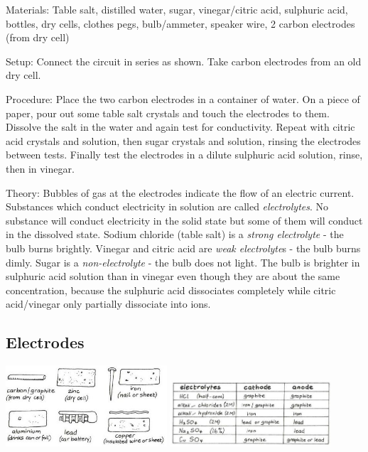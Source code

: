 \begin{multicols}{2}
\begin{description*}
\item[Materials:]{Table salt, distilled water, sugar, vinegar/citric acid, sulphuric acid, bottles, dry cells, clothes pegs, bulb/ammeter, speaker wire, 2 carbon electrodes (from dry cell)}
\item[Setup:]{Connect the circuit in series as shown. Take carbon electrodes from an old dry cell.}
\item[Procedure:]{Place the two carbon electrodes in a container of water. On a piece of paper, pour out some table salt crystals and touch the electrodes to them. Dissolve the salt in the water and again test for conductivity. Repeat with citric acid crystals and solution, then sugar crystals and solution, rinsing the electrodes between tests. Finally test the electrodes in a dilute sulphuric acid solution, rinse, then in vinegar.}
\item[Theory:]{Bubbles of gas at the electrodes indicate the
flow of an electric current. Substances which
conduct electricity in solution are called \emph{electrolytes}. No substance will conduct electricity in the solid state but some of them will
conduct in the dissolved state. Sodium chloride (table salt) is a \emph{strong electrolyte} - the bulb burns brightly. Vinegar and citric acid are \emph{weak electrolyte}s - the bulb burns dimly. Sugar is a \emph{non-electrolyte} - the bulb does not light. The bulb is brighter in sulphuric acid solution than in vinegar even though they are about the same concentration, because the sulphuric acid dissociates completely while citric acid/vinegar only partially dissociate into ions.}
\end{description*}

\subsection{Electrodes}

\begin{center}
\includegraphics[width=0.45\textwidth]{./img/vso/electrodes.jpg}
\includegraphics[width=0.45\textwidth]{./img/vso/electrolyte-electrode.jpg}
\end{center}


\end{multicols}
